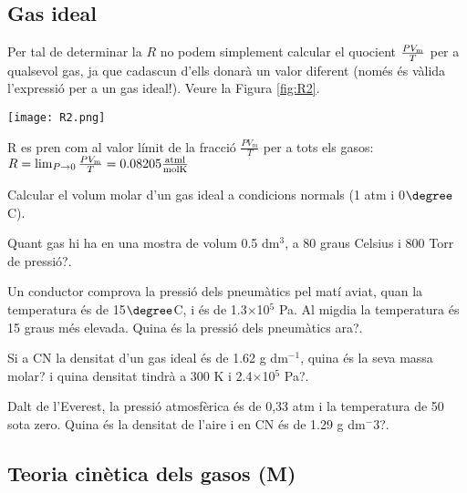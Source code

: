 \subsection{Gas ideal}

Per tal de determinar la $R$ no podem simplement calcular el quocient $\frac{P V_{\rm m}}{T}$ per a qualsevol gas, ja que cadascun d'ells donarà un valor diferent (només és vàlida l'expressió per a un gas ideal!). Veure la Figura \ref{fig:R2}.
\begin{marginfigure}
\centering
\texttt{[image: R2.png]}
\caption[Determinació de la constant dels gasos $R$]{R es pren com al valor límit de la fracció $\frac{P V_m}{T}$ per a tots els gasos: 
$R=\lim_{P \to 0} \frac{P V_{\rm m}}{T}= 0.08205 \frac{{\rm atm l}}{{\rm mol K}}$
}
\label{fig:R2}
\end{marginfigure}

\begin{exr}
Calcular el volum molar d'un gas ideal a condicions normals (1 atm i 0$\degree$C).
\end{exr}

\begin{exr}
Quant gas hi ha en una mostra de volum 0.5 dm$^3$, a 80 graus Celsius i 800 Torr de pressió?.
\end{exr}

\begin{exr}
Un conductor comprova la pressió dels pneumàtics pel matí aviat, quan la temperatura és de 15$\degree$C, i és de 1.3$\times$10$^5$ Pa. Al migdia la temperatura és 15 graus més elevada. Quina és la pressió dels pneumàtics ara?.
\end{exr}

\begin{exr}
Si a CN la densitat d'un gas ideal és de 1.62 g dm$^{-1}$, quina és la seva massa molar? i quina densitat tindrà a 300 K i 2.4$\times$10$^5$ Pa?.
\end{exr}

\begin{exr}
Dalt de l'Everest, la pressió atmosfèrica és de 0,33 atm i la temperatura de 50 sota zero. Quina és la densitat de l'aire i en CN és de 1.29 g dm$^-3$?.
\end{exr}

\subsection{Teoria cinètica dels gasos (M)}

